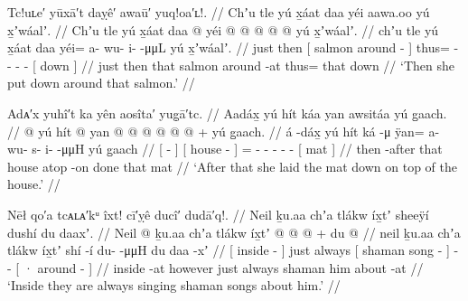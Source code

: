 \ex\label{ex:100-139-down-around}%
%
\begingl
	\glpreamble	Tc!uʟe′ yūxā′t daỵê′ awaū′ yuq!oa′ʟ!. //
	\glpreamble	Chʼu tle yú x̱áat daa yéi aawa.oo yú x̱ʼwáalʼ. //
	\gla	Chʼu tle
		{} yú x̱áat daa @ {} {} 
		yéi @  @ {} @ {} @ {} @ {}
		{} yú x̱ʼwáalʼ. {} //
	\glb	chʼu tle
		{} yú x̱áat daa {} {} 
		yéi= a- wu- i-  -μμL 
		{} yú x̱ʼwáalʼ. {} //
	\glc	just then 
		{}[  salmon around - {}]
		thus= - - -  -
		{}[  down {}] //
	\gld	just then
		{} that salmon around -at {} 
		thus=  {} {} {} {} 
		{} that down {} //
	\glft	‘Then she put down around that salmon.’
		//
\endgl
\xe

\ex\label{ex:100-140-lay-on-top}%
%
\begingl
	\glpreamble	Adᴀ′x yuhî′t ka yên aosîta′ yug̣ā′tc. //
	\glpreamble	Aadáx̱ yú hít káa yan awsitáa yú g̱aach. //
	\gla	{}  @ {} {}
		{} yú hít  @ {} {}
		yan @  @ {} @ {} @ {} @ {} @ {} +
		{} yú g̱aach. {} //
	\glb	{} á -dáx̱ {} 
		{} yú hít ká -μ {}
		ÿan= a- wu- s- i-  -μμH
		{} yú g̱aach {} //
	\glc	{}[  - {}]
		{}[  house  - {}]
		= - -  - -  -
		{}[  mat {}] //
	\gld	{} then -after {} 
		{} that house atop -on {}
		done  {} {} {} {} {}
		{} that mat {} //
	\glft	‘After that she laid the mat down on top of the house.’
		//
\endgl
\xe

\ex\label{ex:100-141-singing-songs}%
%
\begingl
	\glpreamble	Nēł qo′a tcᴀʟᴀ′kᵘ îxt! cī′ỵê ducî′ dudā′q!. //
	\glpreamble	Neil ḵu.aa chʼa tlákw íx̱tʼ sheeÿí dushí du daaxʼ. //
	\gla	{} Neil @ {} {} ḵu.aa
		chʼa tlákw 
		{} íx̱tʼ  @ {} {} 
		 @ {} @ {} +
		{} du  @ {} {} //
	\glb	{} neil {} {} ḵu.aa
		chʼa tlákw
		{} íx̱tʼ shí -í {} 
		du-  -μμH
		{} du daa -xʼ {} //
	\glc	{}[ inside - {}] 
		just always
		{}[ shaman song - {}]
		-  - 
		{}[ · around - {}] //
	\gld	{} inside -at {} however
		just always 
		{} shaman  {} {} 
		 {} {}
		{} him about -at {} //
	\glft	‘Inside they are always singing shaman songs about him.’
		//
\endgl
\xe

